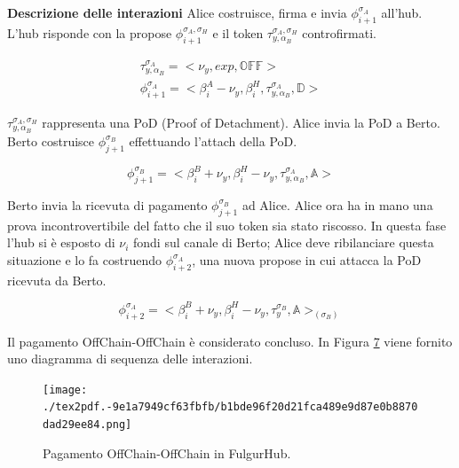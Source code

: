 \documentclass[12pt,italian,]{book}
\begin{document}
\textbf{\textbf{Descrizione delle interazioni}} Alice costruisce, firma e invia \(\phi^{\sigma_A}_{i+1}\) all'hub. L'hub risponde con la propose \(\phi^{\sigma_A,\sigma_H}_{i+1}\) e il token \(\tau^{\sigma_A,\sigma_H}_{y, \alpha_B}\) controfirmati.

\begin{equation}
\begin{aligned}
\label{Propose detach pagamento OffChain-OffChain}
\tau^{\sigma_A}_{y, \alpha_B} =  <\nu_y, exp, \mathbb{OFF}>\\
\phi^{\sigma_A}_{i+1} = <\beta^A_i-\nu_y, \beta^H_i, \tau^{\sigma_A}_{y, \alpha_B} ,\mathbb{D}>
\end{aligned}
\end{equation}

\(\tau^{\sigma_A,\sigma_H}_{y, \alpha_B}\) rappresenta una PoD (Proof of Detachment). Alice invia la PoD a Berto. Berto costruisce \(\phi^{\sigma_B}_{j+1}\) effettuando l'attach della PoD.

\begin{equation}
\label{Propose attach pagamento OffChain-OffChain}
\phi^{\sigma_B}_{j+1} = <\beta^B_i+\nu_y, \beta^H_i-\nu_y, \tau^{\sigma_A}_{y, \alpha_B} ,\mathbb{A}>
\end{equation}

Berto invia la ricevuta di pagamento \(\phi^{\sigma_B}_{j+1}\) ad Alice. Alice ora ha in mano una prova incontrovertibile del fatto che il suo token sia stato riscosso. In questa fase l'hub si è esposto di \(\nu_i\) fondi sul canale di Berto; Alice deve ribilanciare questa situazione e lo fa costruendo \(\phi^{\sigma_A}_{i+2}\), una nuova propose in cui attacca la PoD ricevuta da Berto.

\begin{equation}
\label{Propose attach pagamento OffChain-OffChain}
\phi^{\sigma_A}_{i+2} = <\beta^B_i+\nu_y, \beta^H_i-\nu_y, \tau^{\sigma_B}_y ,\mathbb{A}>_(\sigma_B)
\end{equation}

Il pagamento OffChain-OffChain è considerato concluso. In Figura \protect\hyperlink{caso-duso-offchain-offchain}{7} viene fornito uno diagramma di sequenza delle interazioni.

\begin{figure}
\centering
\texttt{[image: ./tex2pdf.-9e1a7949cf63fbfb/b1bde96f20d21fca489e9d87e0b8870dad29ee84.png]}
\caption{\protect\hypertarget{caso-duso-offchain-offchain}{}{}Pagamento OffChain-OffChain in FulgurHub.}
\end{figure}
\end{document}
